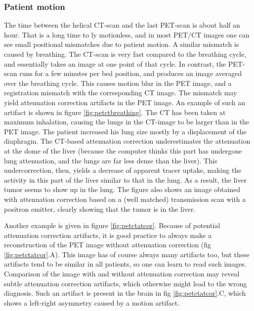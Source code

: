 \documentclass[11pt,oneside]{book}
\begin{document}
\subsubsection{Patient motion}
The time between the helical CT-scan and the last PET-scan is about half an
hour. That is a long time to ly motionless, and in most PET/CT images one can
see small positional mismatches due to patient motion. A similar mismatch is
caused by breathing. The CT-scan is very fast compared to the breathing cycle,
and essentially takes an image at one point of that cycle. In contrast, the
PET-scan runs for a few minutes per bed position, and produces an image
averaged over the breathing cycle. This causes motion blur in the PET image,
and a registration mismatch with the corresponding CT image. The mismatch may
yield attenuation correction artifacts in the PET image. An example of such an
artifact is shown in figure \ref{fig:petctbreathing}. The CT has been taken at
maximum inhalation, causing the lungs in the CT-image to be larger than in the
PET image. The patient increased his lung size mostly by a displacement of the
diaphragm. The CT-based attenuation correction underestimates the attenuation
at the dome of the liver (because the computer thinks this part has undergone
lung attenuation, and the lungs are far less dense than the liver). This
undercorrection, then, yields a decrease of apparent tracer uptake, making the
activity in this part of the liver similar to that in the lung. As a result,
the liver tumor seems to show up in the lung. The figure also shows an image
obtained with attenuation correction based on a (well matched) transmission
scan with a positron emitter, clearly showing that the tumor is in the
liver.

Another example is given in figure \ref{fig:petctatcor}. Because of
potential attenuation correction artifacts, it is good practice to
always make a reconstruction of the PET image without attenuation
correction (fig \ref{fig:petctatcor}.A). This image has of course
always many artifacts too, but these artifacts tend to be similar in all
patients, so one can learn to read such images. Comparison of the
image with and without attenuation correction may reveal subtle
attenuation correction artifacts, which otherwise might lead to the
wrong diagnosis. Such an artifact is present in the brain in fig
\ref{fig:petctatcor}.C, which shows a left-right asymmetry caused by a
motion artifact.
\end{document}
